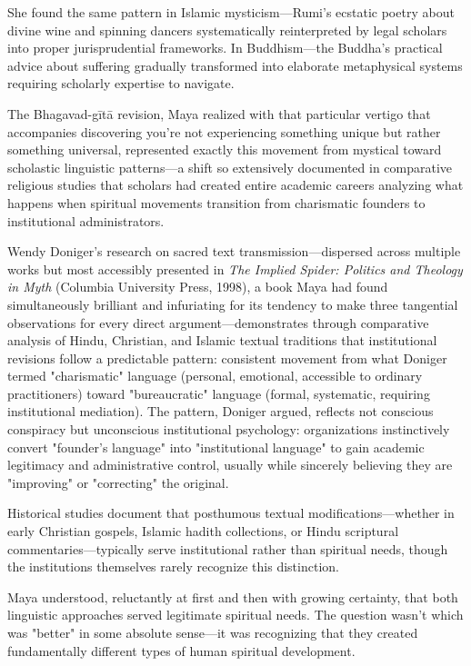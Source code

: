 \documentclass[12pt,twoside]{book}
\begin{document}
She found the same pattern in Islamic mysticism—Rumi's ecstatic poetry about divine wine and spinning dancers systematically reinterpreted by legal scholars into proper jurisprudential frameworks. In Buddhism—the Buddha's practical advice about suffering gradually transformed into elaborate metaphysical systems requiring scholarly expertise to navigate.

The Bhagavad-gītā revision, Maya realized with that particular vertigo that accompanies discovering you're not experiencing something unique but rather something universal, represented exactly this movement from mystical toward scholastic linguistic patterns—a shift so extensively documented in comparative religious studies that scholars had created entire academic careers analyzing what happens when spiritual movements transition from charismatic founders to institutional administrators.

Wendy Doniger's research on sacred text transmission—dispersed across multiple works but most accessibly presented in \emph{The Implied Spider: Politics and Theology in Myth} (Columbia University Press, 1998), a book Maya had found simultaneously brilliant and infuriating for its tendency to make three tangential observations for every direct argument—demonstrates through comparative analysis of Hindu, Christian, and Islamic textual traditions that institutional revisions follow a predictable pattern: consistent movement from what Doniger termed "charismatic" language (personal, emotional, accessible to ordinary practitioners) toward "bureaucratic" language (formal, systematic, requiring institutional mediation). The pattern, Doniger argued, reflects not conscious conspiracy but unconscious institutional psychology: organizations instinctively convert "founder's language" into "institutional language" to gain academic legitimacy and administrative control, usually while sincerely believing they are "improving" or "correcting" the original.

Historical studies document that posthumous textual modifications—whether in early Christian gospels, Islamic hadith collections, or Hindu scriptural commentaries—typically serve institutional rather than spiritual needs, though the institutions themselves rarely recognize this distinction.

Maya understood, reluctantly at first and then with growing certainty, that both linguistic approaches served legitimate spiritual needs. The question wasn't which was "better" in some absolute sense—it was recognizing that they created fundamentally different types of human spiritual development.
\end{document}
